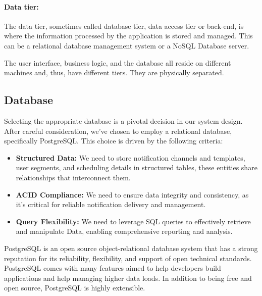 \paragraph{Data tier:}
The data tier, sometimes called database tier, data access tier or back-end, is where the information
processed by the application is stored and managed. This can be a relational database management system
or a NoSQL Database server.

The user interface, business logic, and the database all reside on different machines and, thus, have
different tiers. They are physically separated.



\subsection{Database}
Selecting the appropriate database is a pivotal decision in our system design. After careful consideration,
we've chosen to employ a relational database, specifically PostgreSQL. This choice is driven by the
following criteria:

\begin{itemize}
      \item \textbf{Structured Data:} We need to store notification channels and templates, user segments,
            and scheduling details in structured tables, these entities share relationships that
            interconnect them.
      \item \textbf{ACID Compliance:} We need to ensure data integrity and consistency, as it's critical
            for reliable notification delivery and management.
      \item \textbf{Query Flexibility:} We need to leverage SQL queries to effectively retrieve and manipulate
            Data, enabling comprehensive reporting and analysis.
\end{itemize}

PostgreSQL is an open source object-relational database system that has a strong reputation for its
reliability, flexibility, and support of open technical standards. PostgreSQL comes with many features
aimed to help developers build applications and help managing higher data loads. In addition to being
free and open source, PostgreSQL is highly extensible.

